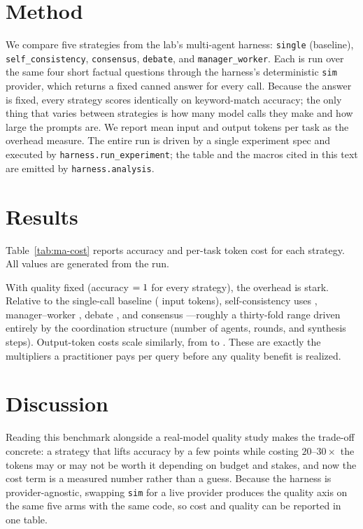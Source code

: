 \documentclass{article}
\begin{document}
\section{Method}
We compare five strategies from the lab's multi-agent harness: \texttt{single}
(baseline), \texttt{self\_consistency}, \texttt{consensus}, \texttt{debate}, and
\texttt{manager\_worker}. Each is run over the same four short factual questions through
the harness's deterministic \texttt{sim} provider, which returns a fixed canned answer
for every call. Because the answer is fixed, every strategy scores identically on
keyword-match accuracy; the only thing that varies between strategies is how many model
calls they make and how large the prompts are. We report mean input and output tokens per
task as the overhead measure. The entire run is driven by a single experiment spec and
executed by \texttt{harness.run\_experiment}; the table and the macros cited in this text
are emitted by \texttt{harness.analysis}.

\section{Results}
Table~\ref{tab:ma-cost} reports accuracy and per-task token cost for each strategy. All
values are generated from the run.



With quality fixed (accuracy $=1{}$ for every strategy), the overhead is
stark. Relative to the single-call baseline (\maSingleTokensIn{} input tokens),
self-consistency uses \maSelfConsistencyTokensIn{}, manager--worker \maManagerWorkerTokensIn{},
debate \maDebateTokensIn{}, and consensus \maConsensusTokensIn{}---roughly a thirty-fold
range driven entirely by the coordination structure (number of agents, rounds, and
synthesis steps). Output-token costs scale similarly, from \maSingleTokensOut{} to
\maConsensusTokensOut{}. These are exactly the multipliers a practitioner pays per query
before any quality benefit is realized.

\section{Discussion}
Reading this benchmark alongside a real-model quality study makes the trade-off concrete:
a strategy that lifts accuracy by a few points while costing $20$--$30\times$ the tokens
may or may not be worth it depending on budget and stakes, and now the cost term is a
measured number rather than a guess. Because the harness is provider-agnostic, swapping
\texttt{sim} for a live provider produces the quality axis on the same five arms with the
same code, so cost and quality can be reported in one table.
\end{document}
